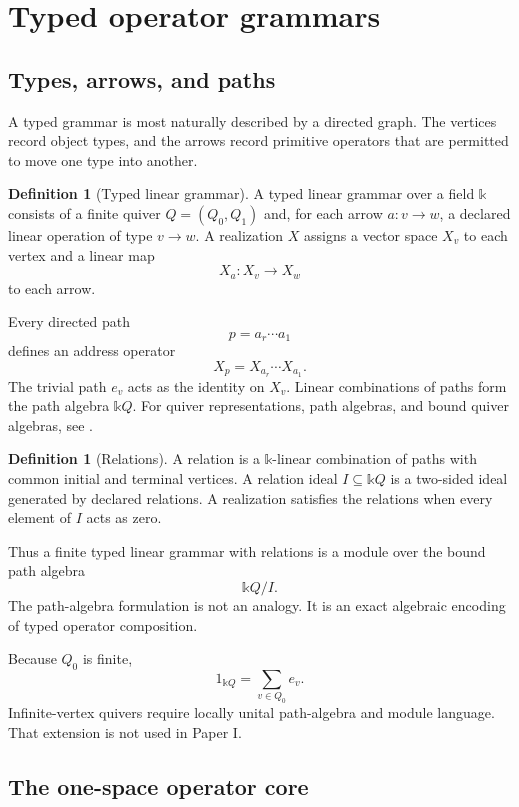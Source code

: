 \documentclass[11pt]{article}
\theoremstyle{definition}
\newtheorem{definition}[theorem]{Definition}
\theoremstyle{remark}
\newcommand{\bbk}{\mathbb{k}}
\begin{document}
\section{Typed operator grammars}

\subsection{Types, arrows, and paths}

A typed grammar is most naturally described by a directed graph. The vertices record object types, and the arrows record primitive operators that are permitted to move one type into another.

\begin{definition}[Typed linear grammar]
A typed linear grammar over a field $\bbk$ consists of a finite quiver $Q=(Q_0,Q_1)$ and, for each arrow $a:v\to w$, a declared linear operation of type $v\to w$. A realization $X$ assigns a vector space $X_v$ to each vertex and a linear map
\[
X_a:X_v\longrightarrow X_w
\]
to each arrow.
\end{definition}

Every directed path
\[
p=a_r\cdots a_1
\]
defines an address operator
\[
X_p=X_{a_r}\cdots X_{a_1}.
\]
The trivial path $e_v$ acts as the identity on $X_v$. Linear combinations of paths form the path algebra $\bbk Q$. For quiver representations, path algebras, and bound quiver algebras, see \cite[Chs.~I--II]{assemSimsonSkowronski2006}.

\begin{definition}[Relations]
A relation is a $\bbk$-linear combination of paths with common initial and terminal vertices. A relation ideal $I\subseteq\bbk Q$ is a two-sided ideal generated by declared relations. A realization satisfies the relations when every element of $I$ acts as zero.
\end{definition}

Thus a finite typed linear grammar with relations is a module over the bound path algebra
\[
\bbk Q/I.
\]
The path-algebra formulation is not an analogy. It is an exact algebraic encoding of typed operator composition.

Because $Q_0$ is finite,
\[
1_{\bbk Q}=\sum_{v\in Q_0}e_v.
\]
Infinite-vertex quivers require locally unital path-algebra and module language. That extension is not used in Paper I.

\subsection{The one-space operator core}
\end{document}
